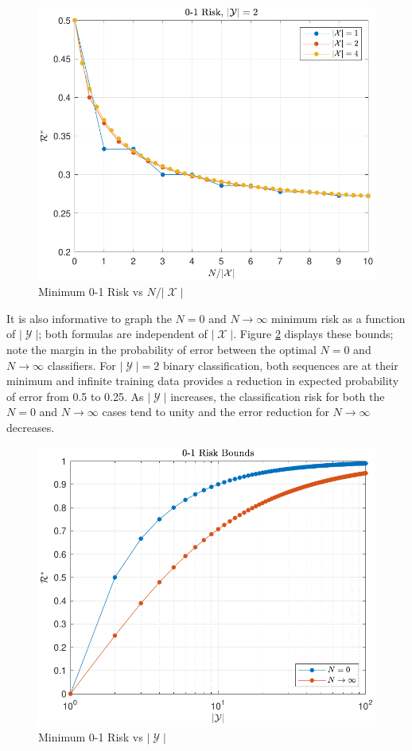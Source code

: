 \documentclass[12pt]{article}
\DeclareMathOperator{\Xcal}{\mathcal{X}}
\DeclareMathOperator{\Ycal}{\mathcal{Y}}
\begin{document}
\begin{figure}
\centering
\includegraphics[width=0.7\linewidth]{Risk_01_uni_N-Mx.pdf}
\caption{Minimum 0-1 Risk vs $N/|\Xcal|$}
\label{fig:Risk_01_uni_N-Mx}
\end{figure}


It is also informative to graph the $N=0$ and $N \to \infty$ minimum risk as a function of $|\Ycal|$; both formulas are independent of $|\Xcal|$. Figure \ref{fig:Risk_01_uni_N_bounds} displays these bounds; note the margin in the probability of error between the optimal $N=0$ and $N \to \infty$ classifiers. For $|\Ycal| = 2$ binary classification, both sequences are at their minimum and infinite training data provides a reduction in expected probability of error from 0.5 to 0.25. As $|\Ycal|$ increases, the classification risk for both the $N=0$ and $N \to \infty$ cases tend to unity and the error reduction for $N \to \infty$ decreases. 





\begin{figure}
\centering
\includegraphics[width=0.7\linewidth]{Risk_01_uni_N_bounds.pdf}
\caption{Minimum 0-1 Risk vs $|\Ycal|$}
\label{fig:Risk_01_uni_N_bounds}
\end{figure}
\end{document}
